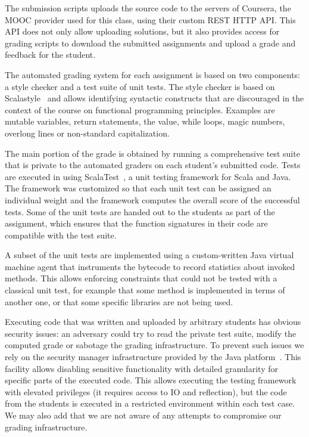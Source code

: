 \documentclass{sig-alternate}
\begin{document}
The submission scripts uploads the source code to the servers of Coursera, the
MOOC provider used for this class, using their custom REST HTTP API. This API
does not only allow uploading solutions, but it also provides access for grading
scripts to download the submitted assignments and upload a grade and feedback
for the student.

The automated grading system for each assignment is based on two components: a
style checker and a test suite of unit tests. The style checker is based on
Scalastyle~\cite{ScalaStyle} and allows identifying syntactic constructs that
are discouraged in the context of the course on functional programming principles.
Examples are mutable variables, return statements, the \lstinline@null@ value,
while loops, magic numbers, overlong lines or non-standard capitalization.

The main portion of the grade is obtained by running a comprehensive test suite
that is private to the automated graders on each student's submitted code.
Tests are executed in using ScalaTest~\cite{scalatest}, a unit testing framework
for Scala and Java. The framework was customized so that each unit test can be
assigned an individual weight and the framework computes the overall score of
the successful tests. Some of the unit tests are handed out to the students as
part of the assignment, which ensures that the function signatures in their code
are compatible with the test suite.

A subset of the unit tests are implemented using a custom-written Java virtual
machine agent \cite{vmagents} that instruments the bytecode to record statistics about
invoked methods. This allows enforcing constraints that could not be tested with a
classical unit test, for example that some method is implemented in terms of another
one, or that some specific libraries are not being used.

Executing code that was written and uploaded by arbitrary students has obvious
security issues: an adversary could try to read the private test suite, modify
the computed grade or sabotage the grading infrastructure. To prevent such issues
we rely on the security manager infrastructure provided by the Java platform~\cite{securityManager}.
This facility allows disabling sensitive functionality with detailed granularity
for specific parts of the executed code. This allows executing the testing framework
with elevated privileges (it requires access to IO and reflection), but the code
from the students is executed in a restricted environment within each test case.
We may also add that we are not aware of any attempts to compromise our grading
infrastructure.
\end{document}
